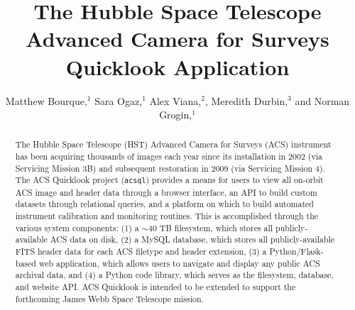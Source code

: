 \documentclass[11pt,twoside]{article}
\begin{document}
\title{The Hubble Space Telescope Advanced Camera for Surveys Quicklook Application}

\author{Matthew Bourque,$^1$ Sara Ogaz,$^1$ Alex Viana,$^2$, Meredith Durbin,$^3$ and Norman Grogin,$^1$
}


\begin{abstract}
The Hubble Space Telescope (HST) Advanced Camera for Surveys (ACS) instrument has been acquiring thousands of images each year
since its installation in 2002 (via Servicing Mission 3B) and subsequent restoration in 2009 (via Servicing Mission 4).
The ACS Quicklook project (\texttt{acsql}) provides a means for users to view all on-orbit ACS image and header data through a
browser interface, an API to build custom datasets through relational queries, and a platform on which to build automated
instrument calibration and monitoring routines.  This is accomplished through the various system components: (1) a $\sim$40 TB
filesystem, which stores all publicly-available ACS data on disk, (2) a MySQL database, which stores all publicly-available
FITS header data for each ACS filetype and header extension, (3) a Python/Flask-based web application, which allows users to
navigate and display any public ACS archival data, and (4) a Python code library, which serves as the filesystem, database,
and website API.  ACS Quicklook is intended to be extended to support the forthcoming James Webb Space Telescope mission.
\end{abstract}
\end{document}
